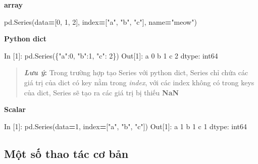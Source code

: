 \documentclass[
]{book}
\newenvironment{Shaded}{\begin{snugshade}}{\end{snugshade}}
\newcommand{\DecValTok}[1]{\textcolor[rgb]{0.00,0.00,0.81}{#1}}
\newcommand{\NormalTok}[1]{#1}
\newcommand{\OperatorTok}[1]{\textcolor[rgb]{0.81,0.36,0.00}{\textbf{#1}}}
\newcommand{\StringTok}[1]{\textcolor[rgb]{0.31,0.60,0.02}{#1}}
\begin{document}
\textbf{array}

\begin{Shaded}
\begin{Highlighting}[]
\NormalTok{pd.Series(data}\OperatorTok{=}\NormalTok{[}\DecValTok{0}\NormalTok{, }\DecValTok{1}\NormalTok{, }\DecValTok{2}\NormalTok{], index}\OperatorTok{=}\NormalTok{[}\StringTok{"a"}\NormalTok{, }\StringTok{"b"}\NormalTok{, }\StringTok{"c"}\NormalTok{], name}\OperatorTok{=}\StringTok{"meow"}\NormalTok{)}
\end{Highlighting}
\end{Shaded}

\textbf{Python dict}

\begin{Shaded}
\begin{Highlighting}[]
\NormalTok{In [}\DecValTok{1}\NormalTok{]: pd.Series(\{}\StringTok{"a"}\NormalTok{:}\DecValTok{0}\NormalTok{, }\StringTok{"b"}\NormalTok{:}\DecValTok{1}\NormalTok{, }\StringTok{"c"}\NormalTok{: }\DecValTok{2}\NormalTok{\})}
\NormalTok{Out[}\DecValTok{1}\NormalTok{]: }
\NormalTok{a    }\DecValTok{0}
\NormalTok{b    }\DecValTok{1}
\NormalTok{c    }\DecValTok{2}
\NormalTok{dtype: int64}
\end{Highlighting}
\end{Shaded}

\begin{quote}
\textbf{\emph{Lưu ý}: } Trong trường hợp tạo Series với python dict, Series chỉ chứa các giá trị của dict có key nằm trong \emph{index}, với các index không có trong keys của dict, Series sẽ tạo ra các giá trị bị thiếu \textbf{NaN}
\end{quote}

\textbf{Scalar}

\begin{Shaded}
\begin{Highlighting}[]
\NormalTok{In [}\DecValTok{1}\NormalTok{]: pd.Series(data}\OperatorTok{=}\DecValTok{1}\NormalTok{, index}\OperatorTok{=}\NormalTok{[}\StringTok{"a"}\NormalTok{, }\StringTok{"b"}\NormalTok{, }\StringTok{"c"}\NormalTok{])}
\NormalTok{Out[}\DecValTok{1}\NormalTok{]: }
\NormalTok{a    }\DecValTok{1}
\NormalTok{b    }\DecValTok{1}
\NormalTok{c    }\DecValTok{1}
\NormalTok{dtype: int64}
\end{Highlighting}
\end{Shaded}

\hypertarget{mux1ed9t-sux1ed1-thao-tuxe1c-cux1a1-bux1ea3n}{%
\subsection*{Một số thao tác cơ bản}\label{mux1ed9t-sux1ed1-thao-tuxe1c-cux1a1-bux1ea3n}}
\end{document}
